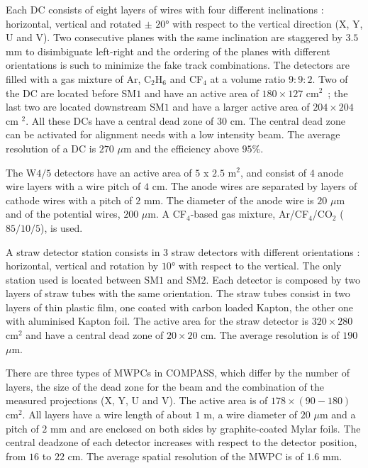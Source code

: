 Each DC consists of eight layers of wires with four different inclinations : horizontal, vertical and rotated $\pm$ $20$° with respect to the vertical direction (X, Y, U and V). Two consecutive planes with the same inclination are staggered by $3.5$ mm to disimbiguate left-right and the ordering of the planes with different orientations is such to minimize the fake track combinations. The detectors are filled with a gas mixture of Ar, C$_2$H$_6$ and CF$_4$ at a volume ratio $9:9:2$. Two of the DC are located before SM$1$ and have an active area of $180 \times 127$ cm$^2$~; the last two are located downstream SM$1$ and have a larger active area of $204 \times 204$ cm $^2$. All these DCs have a central dead zone of $30$ cm. The central dead zone can be activated for alignment needs with a low intensity beam. The average resolution of a DC is $270$ $\mu$m and the efficiency above $95$\%.

The W$4/5$ detectors have an active area of $5$ x $2.5$ m$^2$, and consist of $4$ anode wire layers with a wire pitch of $4$ cm. The anode wires are separated by layers of cathode wires with a pitch of $2$ mm. The diameter of the anode wire is $20$ $\mu$m and of the potential wires, $200$ $\mu$m. A CF$_4$-based gas mixture, Ar/CF$_4$/CO$_2$ ($85/10/5$), is used.

A straw detector station consists in $3$ straw detectors with different orientations : horizontal, vertical and rotation by $10$° with respect to the vertical. The only station used is located between SM$1$ and SM$2$. Each detector is composed by two layers of straw tubes with the same orientation. The straw tubes consist in two layers of thin plastic film, one coated with carbon loaded Kapton, the other one with aluminised Kapton foil. The active area for the straw detector is $320 \times 280$ cm$^2$ and have a central dead zone of $20 \times 20$ cm. The average resolution is of $190$ $\mu$m.

There are three types of MWPCs in COMPASS, which differ by the number of layers, the size of the dead zone for the beam and the combination of the measured projections (X, Y, U and V). The active area is of $178 \times (90-180)$ cm$^2$. All layers have a wire length of about $1$ m, a wire diameter of $20$ $\mu$m and a pitch of $2$ mm and are enclosed on both sides by graphite-coated Mylar foils. The central deadzone of each detector increases with respect to the detector position, from $16$ to $22$ cm. The average spatial resolution of the MWPC is of $1.6$ mm.

